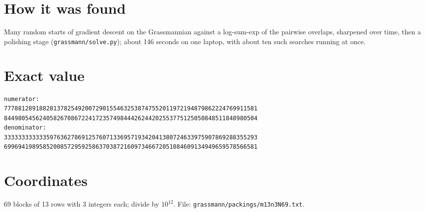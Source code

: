 \documentclass[11pt,a4paper]{article}
\begin{document}
\section{How it was found}
Many random starts of gradient descent on the Grassmannian against a log-sum-exp of the pairwise overlaps, sharpened over time, then a polishing stage (\texttt{grassmann/solve.py}); about 146 seconds on one laptop, with about ten such searches running at once.


\appendix
\section{Exact value}
{\small
\begin{verbatim}
numerator:
777881289188281378254920072901554632538747552011972194879862224769911581
844980545624058267086722417235749844426244202553775125050848511848980504
denominator:
333333333333597636278691257607133695719342041380724633975907869288355293
699694198958520085729592586370387216097346672051084609134949659578566581
\end{verbatim}}

\section{Coordinates}
69 blocks of 13 rows with 3 integers each; divide by $10^{12}$. File: \texttt{grassmann/packings/m13n3N69.txt}.
{\tiny
\begin{multicols}{3}
\end{multicols}}
\end{document}
